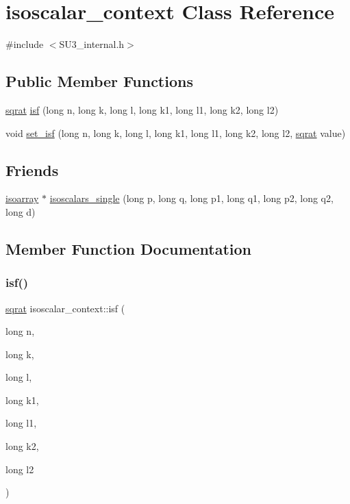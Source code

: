 \hypertarget{classisoscalar__context}{}\section{isoscalar\+\_\+context Class Reference}
\label{classisoscalar__context}


{\ttfamily \#include $<$S\+U3\+\_\+internal.\+h$>$}

\subsection*{Public Member Functions}
\begin{DoxyCompactItemize}
\item 
\mbox{\hyperlink{classsqrat}{sqrat}} \mbox{\hyperlink{classisoscalar__context_a32e31f72a30e0b6b5bd694267132bdc7}{isf}} (long n, long k, long l, long k1, long l1, long k2, long l2)
\item 
void \mbox{\hyperlink{classisoscalar__context_a3331c9cd09a538d5705a6a1ad75a3d99}{set\+\_\+isf}} (long n, long k, long l, long k1, long l1, long k2, long l2, \mbox{\hyperlink{classsqrat}{sqrat}} value)
\end{DoxyCompactItemize}
\subsection*{Friends}
\begin{DoxyCompactItemize}
\item 
\mbox{\hyperlink{classisoarray}{isoarray}} $\ast$ \mbox{\hyperlink{classisoscalar__context_a79b9e82efcee0dcd9db337a918244131}{isoscalars\+\_\+single}} (long p, long q, long p1, long q1, long p2, long q2, long d)
\end{DoxyCompactItemize}


\subsection{Member Function Documentation}
\mbox{\label{classisoscalar__context_a32e31f72a30e0b6b5bd694267132bdc7}} 
\subsubsection{\texorpdfstring{isf()}{isf()}}
{\footnotesize\ttfamily \mbox{\hyperlink{classsqrat}{sqrat}} isoscalar\+\_\+context\+::isf (\begin{DoxyParamCaption}\item[{long}]{n,  }\item[{long}]{k,  }\item[{long}]{l,  }\item[{long}]{k1,  }\item[{long}]{l1,  }\item[{long}]{k2,  }\item[{long}]{l2 }\end{DoxyParamCaption})}

